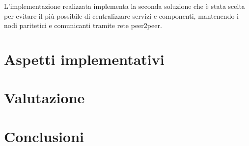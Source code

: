 \documentclass[10pt,a4paper]{article}
\begin{document}
L'implementazione realizzata implementa la seconda soluzione che è stata scelta per evitare il più possibile di centralizzare servizi e componenti, mantenendo i nodi paritetici e comunicanti tramite rete peer2peer. 


\section{Aspetti implementativi}

\section{Valutazione}

\section{Conclusioni}
\end{document}
